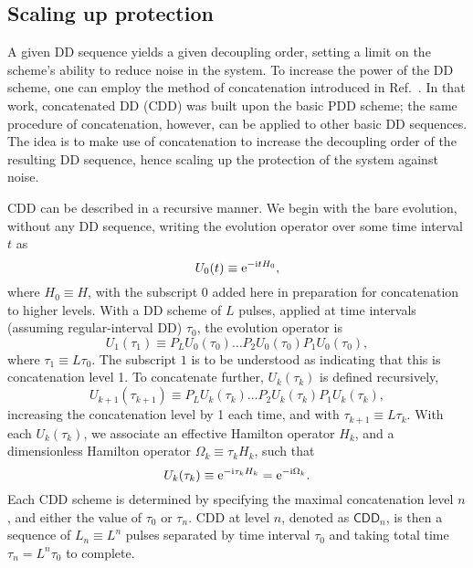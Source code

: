 \documentclass[pra,reprint,superscriptaddress]{revtex4-2}
\newcommand{\CDDn}{\mathsf{CDD}_n}
\begin{document}







\subsection{Scaling up protection}
A given DD sequence yields a given decoupling order, setting a limit on the scheme's ability to reduce noise in the system. To increase the power of the DD scheme, one can employ the method of concatenation introduced in Ref.~\cite{khodjasteh2005fault}. In that work, concatenated DD (CDD) was built upon the basic PDD scheme; the same procedure of concatenation, however, can be applied to other basic DD sequences. The idea is to make use of concatenation to increase the decoupling order of the resulting DD sequence, hence scaling up the protection of the system against noise.

CDD can be described in a recursive manner. We begin with the bare evolution, without any DD sequence, writing the evolution operator over some time interval $t$ as
\begin{equation}
U_0(t)\equiv \mathrm{e}^{-\mathrm{i} t H_0},
\end{equation}
where $H_0\equiv H$, with the subscript $0$ added here in preparation for concatenation to higher levels. With a DD scheme of $L$ pulses, applied at time intervals (assuming regular-interval DD) $\tau_0$, the evolution operator is
\begin{equation}
U_1(\tau_1)\equiv P_LU_0(\tau_0)\ldots P_2U_0(\tau_0)P_1U_0(\tau_0),
\end{equation}
where $\tau_1\equiv L\tau_0$. The subscript $1$ is to be understood as indicating that this is concatenation level 1. To concatenate further, $U_k(\tau_k)$ is defined recursively, 
\begin{equation}
U_{k+1}(\tau_{k+1})\equiv P_LU_k(\tau_k)\ldots P_2U_k(\tau_k)P_1U_k(\tau_k),
\end{equation}
increasing the concatenation level by 1 each time, and with $\tau_{k+1}\equiv L\tau_k$. With each $U_k(\tau_k)$, we associate an effective Hamilton operator $H_k$, and a dimensionless Hamilton operator $\Omega_k\equiv\tau_kH_k$, such that 
\begin{equation}
U_k(\tau_k)\equiv \mathrm{e}^{-\mathrm{i}\tau_k H_k}=\mathrm{e}^{-\mathrm{i}\Omega_k}.
\end{equation}
Each CDD scheme is determined by specifying the maximal concatenation level $n$, and either the value of $\tau_0$ or $\tau_n$. CDD at level $n$, denoted as $\CDDn$, is then a sequence of $L_n\equiv L^n$ pulses separated by time interval $\tau_0$ and taking total time $\tau_n=L^n\tau_0$ to complete.
\end{document}
